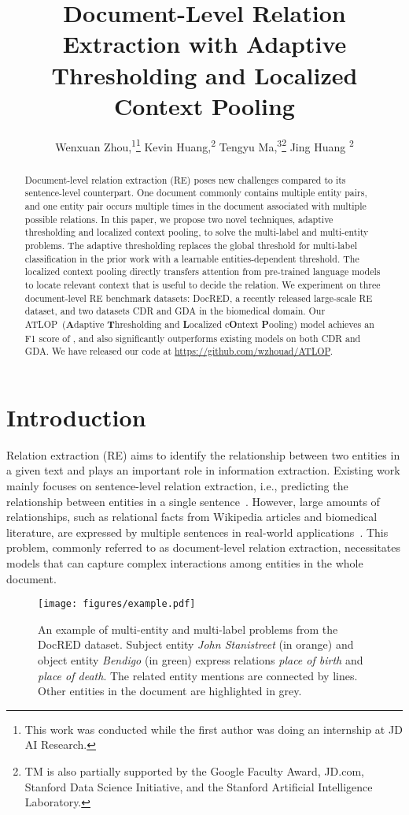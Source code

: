 \documentclass[letterpaper]{article}
\title{Document-Level Relation Extraction with Adaptive Thresholding and Localized Context Pooling}
\author{
Wenxuan Zhou,\textsuperscript{\rm 1}\thanks{This work was conducted while the first author was doing an internship at JD AI Research.}
Kevin Huang,\textsuperscript{\rm 2}
Tengyu Ma,\textsuperscript{\rm 3}\thanks{TM is also partially supported by the Google Faculty Award, JD.com, Stanford Data Science Initiative, and the Stanford Artificial Intelligence Laboratory.}
Jing Huang \textsuperscript{\rm 2}\\}
\date{}
\begin{document}
\maketitle
\begin{abstract}
Document-level relation extraction (RE) poses new challenges compared to its sentence-level counterpart.
One document commonly contains multiple entity pairs, and one entity pair occurs multiple times in the document associated with multiple possible relations. 
In this paper, we propose two novel techniques, adaptive thresholding and localized context pooling, to solve the multi-label and multi-entity problems.
The adaptive thresholding replaces the global threshold for multi-label classification in the prior work with a learnable entities-dependent threshold.
The localized context pooling directly transfers attention from pre-trained language models to locate relevant context that is useful to decide the relation. We experiment on three document-level RE benchmark datasets: DocRED, a recently released large-scale RE dataset, and two datasets CDR and GDA in the biomedical domain.
Our ATLOP~(\textbf{A}daptive \textbf{T}hresholding and \textbf{L}ocalized c\textbf{O}ntext \textbf{P}ooling) model achieves an F1 score of , and also significantly outperforms existing models on both CDR and GDA.
We have released our code at \url{https://github.com/wzhouad/ATLOP}.
\end{abstract}


\section{Introduction}

Relation extraction (RE) aims to identify the relationship between two entities in a given text and plays an important role in information extraction.
Existing work mainly focuses on sentence-level relation extraction, i.e., predicting the relationship between entities in a single sentence~\cite{Zeng2014RelationCV,Miwa2016EndtoEndRE,Zhang2018GraphCO}.
However, large amounts of relationships, such as relational facts from Wikipedia articles and biomedical literature, are expressed by multiple sentences in real-world applications~\cite{Verga2018SimultaneouslyST,Yao2019DocREDAL}.
This problem, commonly referred to as document-level relation extraction, necessitates models that can capture complex interactions among entities in the whole document.

\begin{figure}[!t]
    \centering
    \texttt{[image: figures/example.pdf]}
    \caption{An example of multi-entity and multi-label problems from the DocRED dataset. Subject entity \textit{John Stanistreet} (in orange) and object entity \textit{Bendigo} (in green) express relations \textit{place of birth} and \textit{place of death}. The related entity mentions are connected by lines. Other entities in the document are highlighted in grey.}
    \label{fig:example}
\end{figure}
\end{document}
